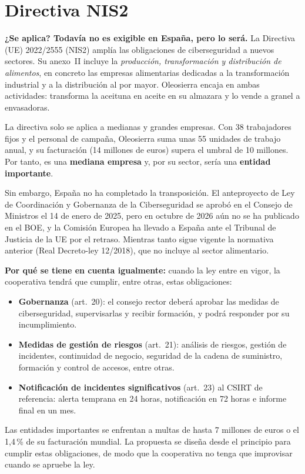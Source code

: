\documentclass[11pt,a4paper,oneside]{report}
\begin{document}
\section{Directiva NIS2}

\textbf{¿Se aplica? Todavía no es exigible en España, pero lo será.} La Directiva (UE) 2022/2555 (NIS2) amplía las obligaciones de ciberseguridad a nuevos sectores. Su anexo~II incluye la \emph{producción, transformación y distribución de alimentos}, en concreto las empresas alimentarias dedicadas a la transformación industrial y a la distribución al por mayor. Oleosierra encaja en ambas actividades: transforma la aceituna en aceite en su almazara y lo vende a granel a envasadoras.

La directiva solo se aplica a medianas y grandes empresas. Con 38 trabajadores fijos y el personal de campaña, Oleosierra suma unas 55 unidades de trabajo anual, y su facturación (14 millones de euros) supera el umbral de 10 millones. Por tanto, es una \textbf{mediana empresa} y, por su sector, sería una \textbf{entidad importante}.

Sin embargo, España no ha completado la transposición. El anteproyecto de Ley de Coordinación y Gobernanza de la Ciberseguridad se aprobó en el Consejo de Ministros el 14 de enero de 2025, pero en octubre de 2026 aún no se ha publicado en el BOE, y la Comisión Europea ha llevado a España ante el Tribunal de Justicia de la UE por el retraso. Mientras tanto sigue vigente la normativa anterior (Real Decreto-ley 12/2018), que no incluye al sector alimentario.

\textbf{Por qué se tiene en cuenta igualmente:} cuando la ley entre en vigor, la cooperativa tendrá que cumplir, entre otras, estas obligaciones:
\begin{itemize}
  \item \textbf{Gobernanza} (art.~20): el consejo rector deberá aprobar las medidas de ciberseguridad, supervisarlas y recibir formación, y podrá responder por su incumplimiento.
  \item \textbf{Medidas de gestión de riesgos} (art.~21): análisis de riesgos, gestión de incidentes, continuidad de negocio, seguridad de la cadena de suministro, formación y control de accesos, entre otras.
  \item \textbf{Notificación de incidentes significativos} (art.~23) al CSIRT de referencia: alerta temprana en 24 horas, notificación en 72 horas e informe final en un mes.
\end{itemize}
Las entidades importantes se enfrentan a multas de hasta 7 millones de euros o el 1,4\,\% de su facturación mundial. La propuesta se diseña desde el principio para cumplir estas obligaciones, de modo que la cooperativa no tenga que improvisar cuando se apruebe la ley.
\end{document}
